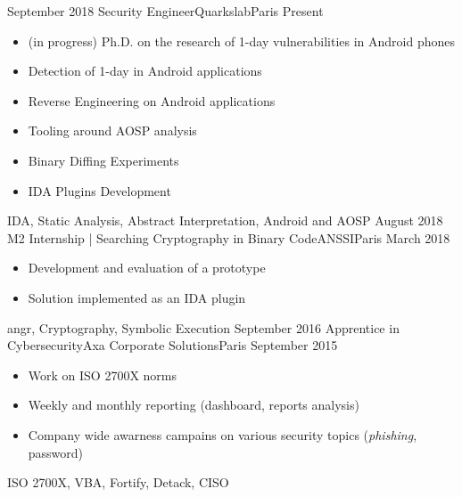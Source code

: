 

\begin{experiences}
  \experience
  {September 2018} {Security Engineer}{Quarkslab}{Paris}
  {Present}{
    \begin{itemize}[topsep=0pt,itemsep=1ex,partopsep=0ex,parsep=0ex]
      \item (in progress) Ph.D. on the research of 1-day vulnerabilities in Android phones
      \item Detection of 1-day in Android applications
      \item Reverse Engineering on Android applications
      \item Tooling around AOSP analysis
      \item Binary Diffing Experiments
      \item IDA Plugins Development
    \end{itemize}
  }
  { IDA, Static Analysis, Abstract Interpretation, Android and AOSP}
  \emptySeparator
  \experience
    {August 2018}   {M2 Internship | Searching Cryptography in Binary Code}{ANSSI}{Paris}
    {March 2018} {
                      \begin{itemize}[topsep=0pt,itemsep=1ex,partopsep=0ex,parsep=0ex]
                        \item Development and evaluation of a prototype
                        \item Solution implemented as an IDA plugin
                      \end{itemize}
                    }
                    {angr, Cryptography, Symbolic Execution}
  \emptySeparator
  \experience
    {September 2016} {Apprentice in Cybersecurity}{Axa Corporate Solutions}{Paris}
    {September 2015}    {
                      \begin{itemize}[topsep=0pt,itemsep=1ex,partopsep=0ex,parsep=0ex]
                        \item Work on ISO 2700X norms
                        \item Weekly and monthly reporting (dashboard, reports analysis)
                        \item Company wide awarness campains on various security topics (\emph{phishing}, password)
                      \end{itemize}
                    }
                    {ISO 2700X, VBA, Fortify, Detack, CISO}
\end{experiences}
